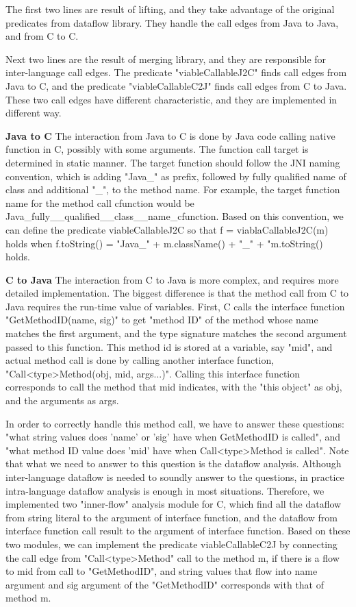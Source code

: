The first two lines are result of lifting, and they take advantage of the
original predicates from dataflow library.  They handle the call edges from
Java to Java, and from C to C.

Next two lines are the result of merging library, and they are responsible for
inter-language call edges.  The predicate "viableCallableJ2C" finds call edges
from Java to C, and the predicate "viableCallableC2J" finds call edges from
C to Java. These two call edges have different characteristic, and they
are implemented in different way.

\textbf{Java to C} The interaction from Java to C is done by Java code
calling native function in C, possibly with some arguments. The function
call target is determined in static manner. The target function should
follow the JNI naming convention, which is adding "Java\_" as prefix, 
followed by fully qualified name of class and additional "\_", to the
method name. For example, the target function name for the method call
cfunction would be Java\_fully\_\_qualified\_\_class\_\_name\_cfunction.
Based on this convention, we can define the predicate viableCallableJ2C
so that f = viablaCallableJ2C(m) holds when f.toString() = "Java\_" + 
m.className() + "\_" + "m.toString() holds.

\textbf{C to Java} The interaction from C to Java is more complex, and
requires more detailed implementation. The biggest difference is that
the method call from C to Java requires the run-time value of variables.
First, C calls the interface function "GetMethodID(name, sig)" to get "method
ID" of the method whose name matches the first argument, and the type signature
matches the second argument passed to this function. This method id is stored
at a variable, say "mid", and actual method call is done by calling another
interface function, "Call<type>Method(obj, mid, args...)". Calling this interface
function corresponds to call the method that mid indicates, with the "this object" as
obj, and the arguments as args.

In order to correctly handle this method call, we have to answer these
questions: "what string values does 'name' or 'sig' have when GetMethodID is
called", and "what method ID value does 'mid' have when Call<type>Method is
called". Note that what we need to answer to this question is the dataflow
analysis. Although inter-language dataflow is needed to soundly answer to the
questions, in practice intra-language dataflow analysis is enough in most
situations. Therefore, we implemented two "inner-flow" analysis module for C,
which find all the dataflow from string literal to the argument of interface
function, and the dataflow from interface function call result to the argument
of interface function. Based on these two modules, we can implement the
predicate viableCallableC2J by connecting the call edge from "Call<type>Method"
call to the method m, if there is a flow to mid from call to "GetMethodID", and
string values that flow into name argument and sig argument of the "GetMethodID"
corresponds with that of method m.

